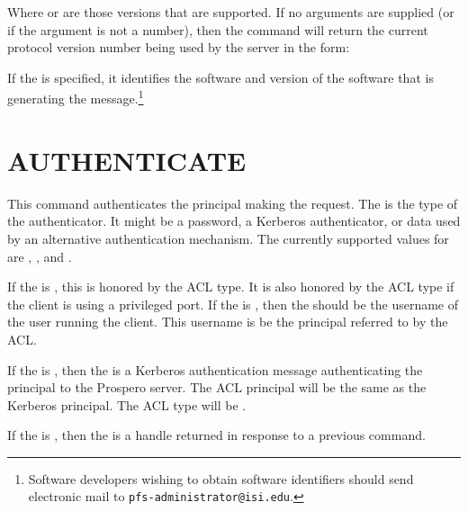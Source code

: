 Where  or
\lit{-} are those
versions that are supported.   
If no arguments are supplied (or if the argument is not a 
number), then the  command will return the current
protocol version number being used by the server in the form:

\begin{command}
    \zoos{}\zooe 
\end{command}

If the  is specified, it identifies
the software and version of the software that is generating the
message.\footnote{Software developers wishing to obtain software
identifiers should send electronic mail to {\tt pfs-administrator@isi.edu}.}

\section{AUTHENTICATE}

\begin{command}
  \commandsize {}  
	 \zoms{}\zome
\end{command}

This command authenticates the principal making the request.  The
 is the type of the authenticator.  It might
be a password, a Kerberos 
authenticator, or data used by an alternative authentication
mechanism.  The currently supported values for
 are , ,
and .

If the  is , this is
honored by the  ACL type.  It is also honored by the  ACL
type if the client is
using a privileged port.  If the  is 
, then the  should be
the username of the user running the client.  This username is be the
principal referred to by the ACL.  

If the  is , then the
 is a Kerberos authentication message
authenticating the 
principal to the Prospero server.  The ACL principal will be the same as the
Kerberos principal.  The ACL type will be  .

If the  is , then the
 is a handle returned in response to a
previous  command.  

